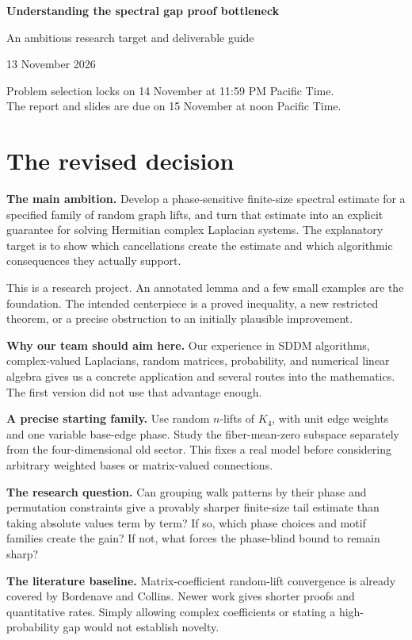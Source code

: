 \documentclass[11pt,letterpaper]{article}
\begin{document}
{\LARGE\bfseries Understanding the spectral gap proof bottleneck\par}
\vspace{0.4em}
{\large An ambitious research target and deliverable guide\par}
13 November 2026\par
{\small Problem selection locks on 14 November at 11:59 PM Pacific Time.\\
The report and slides are due on 15 November at noon Pacific Time.\par}
\vspace{0.6em}

\section*{The revised decision}

\textbf{The main ambition.} Develop a phase-sensitive finite-size spectral estimate for a specified family of random graph lifts, and turn that estimate into an explicit guarantee for solving Hermitian complex Laplacian systems. The explanatory target is to show which cancellations create the estimate and which algorithmic consequences they actually support.

This is a research project. An annotated lemma and a few small examples are the foundation. The intended centerpiece is a proved inequality, a new restricted theorem, or a precise obstruction to an initially plausible improvement.

\textbf{Why our team should aim here.} Our experience in SDDM algorithms, complex-valued Laplacians, random matrices, probability, and numerical linear algebra gives us a concrete application and several routes into the mathematics. The first version did not use that advantage enough.

\textbf{A precise starting family.} Use random $n$-lifts of $K_4$, with unit edge weights and one variable base-edge phase. Study the fiber-mean-zero subspace separately from the four-dimensional old sector. This fixes a real model before considering arbitrary weighted bases or matrix-valued connections.

\textbf{The research question.} Can grouping walk patterns by their phase and permutation constraints give a provably sharper finite-size tail estimate than taking absolute values term by term? If so, which phase choices and motif families create the gain? If not, what forces the phase-blind bound to remain sharp?

\textbf{The literature baseline.} Matrix-coefficient random-lift convergence is already covered by Bordenave and Collins. Newer work gives shorter proofs and quantitative rates. Simply allowing complex coefficients or stating a high-probability gap would not establish novelty.
\end{document}
